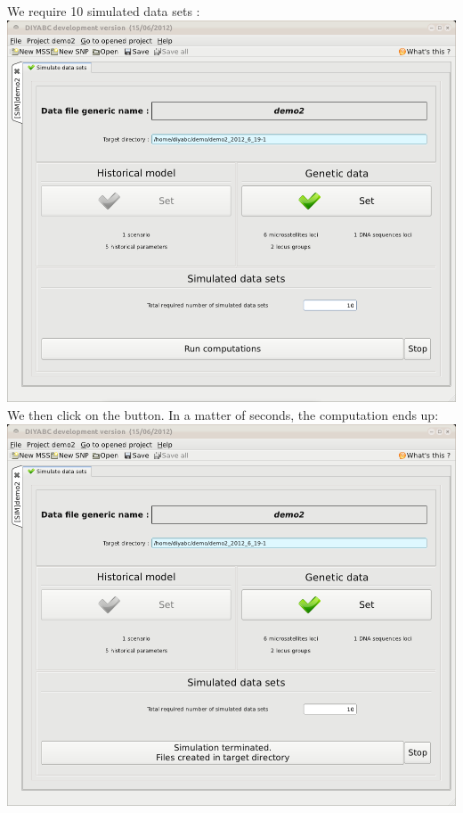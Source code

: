 We require 10 simulated data sets :\\

\includegraphics[scale=0.33]{gui_pictures/Capture-DIYABC-85.png} \\

\newpage
We then click on the  button. In a matter of seconds, the computation ends up:\\

\includegraphics[scale=0.33]{gui_pictures/Capture-DIYABC-86.png} \\

